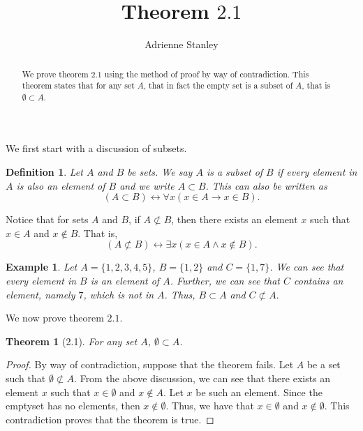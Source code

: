 \documentclass[12pt,reqno]{amsart}
\title{Theorem $2.1$}
\author{Adrienne Stanley}
\theoremstyle{plain}
\newtheorem*{theorem*}{Theorem}
\newtheorem{definition}{Definition}
\newtheorem{example}{Example}
\begin{document}
\begin{abstract}
We prove theorem $2.1$ using the method of proof by way of contradiction.  This theorem states that for any set $A$, that in fact the empty set is a subset of $A$, that is $\emptyset \subset A$.
\end{abstract}

\maketitle

We first start with a discussion of subsets.

\begin{definition}
Let $A$ and $B$ be sets.  We say $A$ is a subset of $B$ if every element in $A$ is also an element of $B$ and we write $A \subset B$.  This can also be written as
$$ (A \subset B) \leftrightarrow \forall x ( x \in A \to x \in B).$$
\end{definition}

Notice that for sets $A$ and $B$, if $A \not\subset B$, then there exists an element $x$ such that $x \in A$ and $x \notin B$.  That is,
$$(A \not\subset B) \leftrightarrow \exists x ( x \in A \wedge x \notin B).$$

\begin{example}
Let $A = \{ 1, 2, 3, 4, 5 \} $, $B = \{ 1, 2 \}$ and $C = \{ 1, 7 \}$.  We can see that every element in $B$ is an element of $A$.  Further, we can see that $C$ contains an element, namely $7$, which is not in $A$.  Thus, $B \subset A$ and $C \not\subset A.$
\end{example}

We now prove theorem $2.1$.

\begin{theorem*}[2.1]
For any set $A$, $\emptyset \subset A$.
\end{theorem*}

\begin{proof}
By way of contradiction, suppose that the theorem fails.  Let $A$ be a set such that $\emptyset \not\subset A.$  From the above discussion, we can see that there exists an element $x$ such that $x \in \emptyset$ and $x \notin A$.  Let $x$ be such an element.  Since the emptyset has no elements, then $x \notin \emptyset$.  Thus, we have that $x \in \emptyset$ and $x \notin \emptyset.$ This contradiction proves that the theorem is true.
\end{proof}
\end{document}
